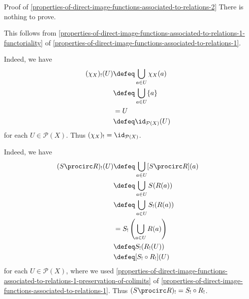 \begin{Proof}{Proof of \cref{properties-of-direct-image-functions-associated-to-relations-2}}%
    There is nothing to prove.

    This follows from \cref{properties-of-direct-image-functions-associated-to-relations-1-functoriality} of \cref{properties-of-direct-image-functions-associated-to-relations-1}.

    Indeed, we have
    \begin{align*}
        (\chi_{X})_{!}(U) &\defeq \bigcup_{a\in U}\chi_{X}(a)\\
                          &\defeq \bigcup_{a\in U}\{a\}\\
                          &=      U\\
                          &\defeq \id_{\mathcal{P}(X)}(U)
    \end{align*}
    for each $U\in\mathcal{P}(X)$. Thus $(\chi_{X})_{!}=\id_{\mathcal{P}(X)}$.

    Indeed, we have
    \begin{align*}
        (S\procirc R)_{!}(U) &\defeq \bigcup_{a\in U}[S\procirc R](a)\\
                             &\defeq \bigcup_{a\in U}S(R(a))\\
                             &\defeq \bigcup_{a\in U}S_{!}(R(a))\\
                             &=      S_{!}\left(\bigcup_{a\in U}R(a)\right)\\
                             &\defeq S_{!}(R_{!}(U))\\
                             &\defeq [S_{!}\circ R_{!}](U)
    \end{align*}
    for each $U\in\mathcal{P}(X)$, where we used \cref{properties-of-direct-image-functions-associated-to-relations-1-preservation-of-colimits} of \cref{properties-of-direct-image-functions-associated-to-relations-1}. Thus $(S\procirc R)_{!}=S_{!}\circ R_{!}$.
\end{Proof}
